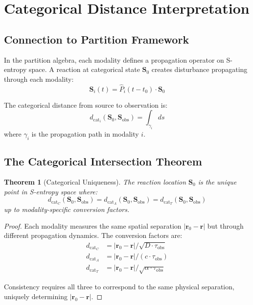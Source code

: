 \documentclass[11pt,a4paper]{article}
\newtheorem{theorem}{Theorem}[section]
\theoremstyle{remark}
\newcommand{\Scoord}{\mathbf{S}}
\newcommand{\dcat}{d_{\mathrm{cat}}}
\newcommand{\rxnpos}{\mathbf{r}_0}
\newcommand{\rxntime}{t_0}
\newcommand{\obspos}{\mathbf{r}}
\begin{document}
\section{Categorical Distance Interpretation}
\label{sec:categorical}

\subsection{Connection to Partition Framework}

In the partition algebra, each modality defines a propagation operator on S-entropy space. A reaction at categorical state $\Scoord_0$ creates disturbance propagating through each modality:
\begin{equation}
    \Scoord_i(t) = \hat{P}_i(t-\rxntime) \cdot \Scoord_0
\end{equation}

The categorical distance from source to observation is:
\begin{equation}
    \dcat_i(\Scoord_0, \Scoord_{\text{obs}}) = \int_{\gamma_i} ds
\end{equation}
where $\gamma_i$ is the propagation path in modality $i$.

\subsection{The Categorical Intersection Theorem}

\begin{theorem}[Categorical Uniqueness]
\label{thm:cat_unique}
The reaction location $\Scoord_0$ is the unique point in S-entropy space where:
\begin{equation}
    \dcat_C(\Scoord_0, \Scoord_{\text{obs}}) = \dcat_A(\Scoord_0, \Scoord_{\text{obs}}) = \dcat_T(\Scoord_0, \Scoord_{\text{obs}})
\end{equation}
up to modality-specific conversion factors.
\end{theorem}

\begin{proof}
Each modality measures the same spatial separation $|\rxnpos - \obspos|$ but through different propagation dynamics. The conversion factors are:
\begin{align}
    \dcat_C &= |\rxnpos - \obspos| / \sqrt{D \cdot \tau_{\text{obs}}} \\
    \dcat_A &= |\rxnpos - \obspos| / (c \cdot \tau_{\text{obs}}) \\
    \dcat_T &= |\rxnpos - \obspos| / \sqrt{\alpha \cdot \tau_{\text{obs}}}
\end{align}

Consistency requires all three to correspond to the same physical separation, uniquely determining $|\rxnpos - \obspos|$.
\end{proof}
\end{document}
